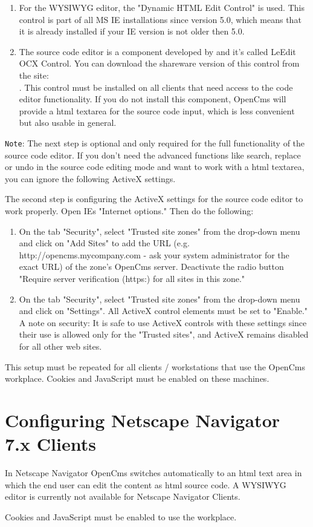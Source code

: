 \begin{enumerate}
\item For the WYSIWYG editor, the "Dynamic HTML Edit Control" is
used. This control is part of all MS IE installations since
version 5.0, which means that it is already installed if your IE version 
is not older then 5.0. 

\item The source code editor is a component developed by 
     and it's
called LeEdit OCX Control. You can download the shareware version
of this control from the site:\\
.
This control must be installed on all clients that need access to
the code editor functionality.
If you do not install this component, OpenCms will provide a html
textarea for the source code input, which is less convenient but
also usable in general.
\end{enumerate}

\texttt{Note}: The next step is optional and only required for the full functionality of the source code editor.
If you don't need the advanced functions like search, replace or undo in the source code editing mode 
and want to work with a html textarea, 
you can ignore the following ActiveX settings.

The second step is configuring the ActiveX settings for the source code editor to work properly.
Open IEs "Internet options." Then do the
following:

\begin{enumerate}
\item On the tab "Security", select "Trusted site zones" from the
drop-down menu and click on "Add Sites" to add the URL (e.g.
http://opencms.mycompany.com - ask your system administrator for
the exact URL) of the zone's OpenCms server. Deactivate the radio
button "Require server verification (https:) for all sites in this
zone."
\item On the tab "Security", select "Trusted site zones"
from the drop-down menu and click on "Settings". All ActiveX
control elements must be set to "Enable." A note on security: It
is safe to use ActiveX controls with these settings since their
use is allowed only for the "Trusted sites", and ActiveX remains
disabled for all other web sites.
\end{enumerate}

This setup must be repeated for all clients / workstations that
use the OpenCms workplace. Cookies and JavaScript must be enabled 
on these machines.


\section{Configuring Netscape Navigator 7.x Clients}

In Netscape Navigator OpenCms switches automatically to an html 
text area in which the end user can edit the content as html 
source code. A WYSIWYG editor is currently not available for
Netscape Navigator Clients.

Cookies and JavaScript must be enabled to use the workplace.
